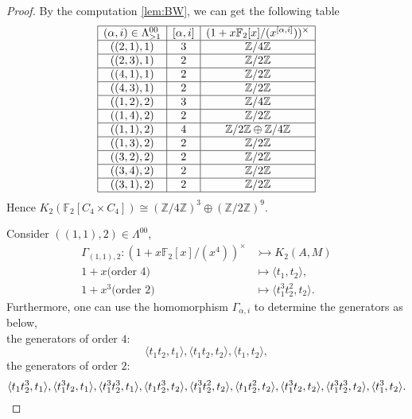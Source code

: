 \begin{proof}
	By the computation \ref{lem:BW}, we can get the following table
	\[\begin{array}{|c|c|c|c|}
\hline
(\alpha,i)\in \Lambda^{00}_{>1} & [\alpha,i] & (1+x \mathbb{F}_2[x]/(x^{[\alpha,i]}))^{\times} \\
\hline
((2,1),1)  & 3 & \mathbb{Z}/4 \mathbb{Z}\\
\hline
((2,3),1)  & 2& \mathbb{Z}/2 \mathbb{Z} \\
\hline
((4,1),1)  & 2& \mathbb{Z}/2 \mathbb{Z} \\
\hline
((4,3),1)  & 2& \mathbb{Z}/2 \mathbb{Z} \\
\hline
((1,2),2)  & 3& \mathbb{Z}/4 \mathbb{Z} \\
\hline
((1,4),2)  & 2& \mathbb{Z}/2 \mathbb{Z} \\
\hline
((1,1),2)  & 4& \mathbb{Z}/2 \mathbb{Z}\oplus \mathbb{Z}/4 \mathbb{Z} \\
\hline
((1,3),2)  & 2& \mathbb{Z}/2 \mathbb{Z} \\
\hline
((3,2),2)  & 2& \mathbb{Z}/2 \mathbb{Z} \\
\hline
((3,4),2)  & 2& \mathbb{Z}/2 \mathbb{Z} \\
\hline
((3,1),2)  & 2& \mathbb{Z}/2 \mathbb{Z}\\
\hline
\end{array}\]
Hence $K_2(\mathbb{F}_2[C_4\times C_4])  \cong (\mathbb{Z}/4 \mathbb{Z})^3 \oplus (\mathbb{Z}/2 \mathbb{Z})^9$.

Consider $((1,1),2)\in \Lambda^{00}$,
  \begin{align*}
 \Gamma_{(1,1),2} \colon (1+x \mathbb{F}_2[x]/(x^{4}))^{\times} &\rightarrowtail K_2(A,M)\\
 1+x \text{(order 4)} &\mapsto \langle t_1,t_2 \rangle,\\
 1+x^3 \text{(order 2)} &\mapsto \langle t_1^3t_2^{2},t_2 \rangle.
 \end{align*}
Furthermore, one can use the homomorphism $\Gamma_{\alpha,i}$ to determine the generators as below,\\
the generators of order $4$:
\[\langle t_1t_2,t_1 \rangle, \langle t_1t_2,t_2 \rangle, \langle t_1,t_2 \rangle,\] 
the generators of order $2$:
\[\langle t_1t_2^3,t_1 \rangle, \langle t_1^3t_2,t_1 \rangle, \langle t_1^3t_2^3,t_1 \rangle,\langle t_1t_2^3,t_2 \rangle, \langle t_1^3t_2^2,t_2 \rangle, \langle t_1t_2^2,t_2 \rangle,\langle t_1^3t_2,t_2 \rangle, \langle t_1^3t_2^3,t_2 \rangle, \langle t_1^3,t_2 \rangle. \qedhere\]
\end{proof}
